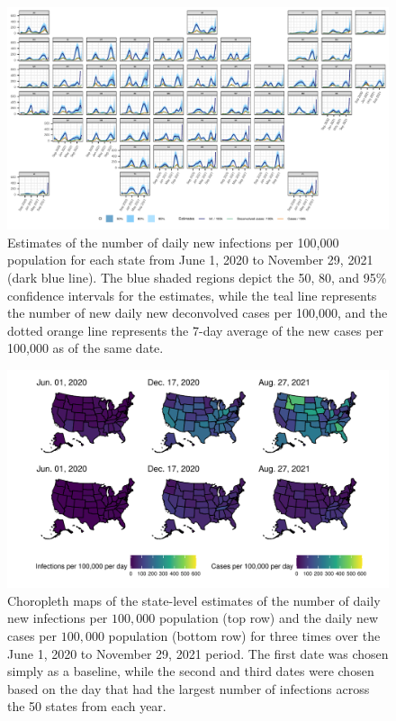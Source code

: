 \documentclass{article}
\begin{document}
\begin{figure}[!tb]
    \centering
        \includegraphics[width=.99\linewidth]{state_niauc_est_faceted_F24.pdf} 
        \caption{Estimates of the number of daily new infections per 100,000
            population for each \US state from June 1, 2020 to November 29, 2021
            (dark blue line). The blue shaded regions depict the 50, 80, and 95\%
            confidence intervals for the estimates, while the teal line represents
            the number of new daily new deconvolved cases per 100,000, and the
            dotted orange line represents the 7-day average of the new cases per
            100,000 as of the same date.}
        \label{fig:state_infect_est}
    \end{figure}
    

\begin{figure}[!tb]
\centering
    \includegraphics[width=.99\textwidth]{choro_inf_case_rates_F24.pdf}
    \caption{Choropleth maps of the state-level estimates of the number of daily
    new infections per $100,000$ population (top row) and the daily new cases
    per $100,000$ population (bottom row) for three times over the June 1, 2020
    to November 29, 2021 period. The first date was chosen simply as a baseline,
    while the second and third dates were chosen based on the day that had the
    largest number of infections across the 50 states from each year.} 
    \label{fig:choro_inf_case_rates}
\end{figure}    
\end{document}
